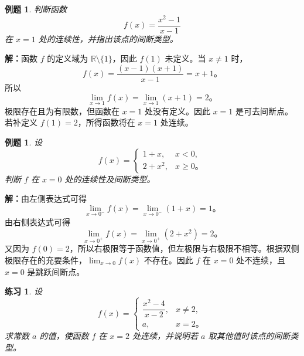 \documentclass[UTF8,fontset=fandol,11pt]{ctexart}
\newtheorem{example}[definition]{例题}
\newtheorem{exercise}[definition]{练习}
\begin{document}
\begin{example}
判断函数
\[
f(x)=\frac{x^2-1}{x-1}
\]
在 $x=1$ 处的连续性，并指出该点的间断类型。
\end{example}
\par\noindent\textbf{解：}函数 $f$ 的定义域为 $\mathbb{R}\setminus\{1\}$，因此 $f(1)$ 未定义。当 $x\neq1$ 时，
\[
f(x)=\frac{(x-1)(x+1)}{x-1}=x+1\text{。}
\]
所以
\[
\lim_{x\to1}f(x)=\lim_{x\to1}(x+1)=2\text{。}
\]
极限存在且为有限数，但函数在 $x=1$ 处没有定义。因此 $x=1$ 是可去间断点。若补定义 $f(1)=2$，所得函数将在 $x=1$ 处连续。\par
\begin{example}
设
\[
f(x)=
\begin{cases}
1+x,&x<0,\\
2+x^2,&x\geq0\text{。}
\end{cases}
\]
判断 $f$ 在 $x=0$ 处的连续性及间断类型。
\end{example}
\par\noindent\textbf{解：}由左侧表达式可得
\[
\lim_{x\to0^-}f(x)=\lim_{x\to0^-}(1+x)=1\text{。}
\]
由右侧表达式可得
\[
\lim_{x\to0^+}f(x)=\lim_{x\to0^+}(2+x^2)=2\text{。}
\]
又因为 $f(0)=2$，所以右极限等于函数值，但左极限与右极限不相等。根据双侧极限存在的充要条件，$\lim_{x\to0}f(x)$ 不存在。因此 $f$ 在 $x=0$ 处不连续，且 $x=0$ 是跳跃间断点。\par
\begin{exercise}
\label{mathagent:exercise:89dc01d13bdd47d62d3f0c96d9d7bd4201cee6446e15a7269f32977f2b24d58c}
设
\[
f(x)=
\begin{cases}
\dfrac{x^2-4}{x-2},&x\neq2,\\
a,&x=2\text{。}
\end{cases}
\]
求常数 $a$ 的值，使函数 $f$ 在 $x=2$ 处连续，并说明若 $a$ 取其他值时该点的间断类型。
\end{exercise}
\end{document}
